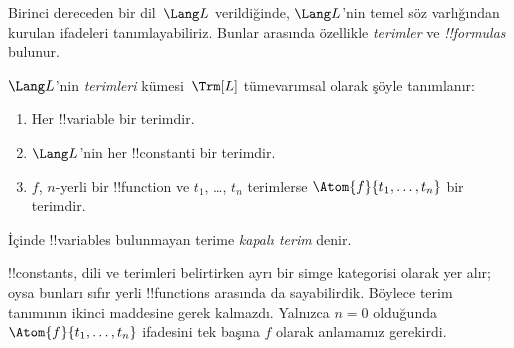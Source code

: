 



Birinci dereceden bir dil~$\Lang L$ verildiğinde, $\Lang L$'nin temel söz
varlığından kurulan ifadeleri tanımlayabiliriz. Bunlar arasında özellikle
\emph{terimler} ve \emph{!!{formula}s} bulunur.

\begin{defn}[Terimler]
$\Lang L$'nin \emph{terimleri} kümesi~$\Trm[L]$ tümevarımsal olarak
şöyle tanımlanır:
\begin{enumerate}
\item Her !!{variable} bir terimdir.
\item $\Lang L$'nin her !!{constant}{}i bir terimdir.
\item $f$, $n$-yerli bir !!{function} ve $t_1$, \dots, $t_n$
  terimlerse $\Atom{f}{t_1, \ldots, t_n}$ bir terimdir.
\end{enumerate}
İçinde !!{variable}s bulunmayan terime \emph{kapalı terim} denir.
\end{defn}

\begin{explain}
!!{constant}s, dili ve terimleri belirtirken ayrı bir simge kategorisi
olarak yer alır; oysa bunları sıfır yerli !!{function}s arasında da
sayabilirdik. Böylece terim tanımının ikinci maddesine gerek kalmazdı.
Yalnızca $n = 0$ olduğunda $\Atom{f}{t_1, \ldots, t_n}$ ifadesini tek
başına $f$ olarak anlamamız gerekirdi.
\end{explain}

